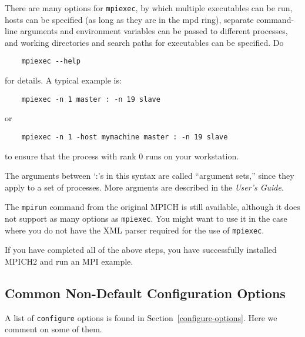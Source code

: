 \documentclass[dvipdfm,11pt]{article}
\begin{document}
\begin{enumerate}
There are many options for \texttt{mpiexec}, by which multiple executables
can be run, hosts can be specified (as long as they are in the mpd
ring), separate command-line arguments and environment variables can
be passed to different processes, and working directories and search
paths for executables can be specified.  Do
\begin{verbatim}
    mpiexec --help
\end{verbatim}
for details. A typical example is:
\begin{verbatim}
    mpiexec -n 1 master : -n 19 slave
\end{verbatim}
or
\begin{verbatim}
    mpiexec -n 1 -host mymachine master : -n 19 slave
\end{verbatim}
to ensure that the process with rank 0 runs on your workstation.

The arguments between `:'s in this syntax are called ``argument sets,''
since they apply to a set of processes.  More argments are described in
the \textit{User's Guide}.

The \texttt{mpirun} command from the original MPICH is still available,
although it does not support as many options as \texttt{mpiexec}.  You might
want to use it in the case where you do not have the XML parser
required for the use of \texttt{mpiexec}.
\end{enumerate}

If you have completed all of the above steps, you have successfully
installed MPICH2 and run an MPI example.  


\subsection{Common Non-Default Configuration Options}
\label{sec:non-default}

A list of \texttt{configure} options is found in
Section~\ref{configure-options}.  Here we comment on some of them.  
\end{document}
